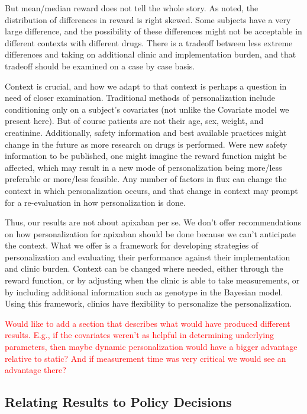 But mean/median reward does not tell the whole story.  As noted, the distribution of differences in reward is right skewed.  Some subjects have a very large difference, and the possibility of these differences might not be acceptable in different contexts with different drugs.  There is a tradeoff between less extreme differences and taking on additional clinic and implementation burden, and that tradeoff should be examined on a case by case basis.

Context is crucial, and how we adapt to that context is perhaps a question in need of closer examination.  Traditional methods of personalization include conditioning only on a subject’s covariates (not unlike the Covariate model we present here).  But of course patients are not their age, sex, weight, and creatinine.  Additionally, safety information and best available practices might change in the future as more research on drugs is performed. Were new safety information to be published, one might imagine the reward function might be affected, which may result in a new mode of personalization being more/less preferable or more/less feasible.  Any number of factors in flux can change the context in which personalization occurs, and that change in context may prompt for a re-evaluation in how personalization is done.

Thus, our results are not about apixaban per se.  We don’t offer recommendations on how personalization for apixaban should be done because we can’t anticipate the context.  What we offer is a framework for developing strategies of personalization and evaluating their performance against their implementation and clinic burden.  Context can be changed where needed, either through the reward function, or by adjusting when the clinic is able to take measurements, or by including additional information such as genotype in the Bayesian model.  Using this framework, clinics have flexibility to personalize the personalization.

\textcolor{red}{Would like to add a section that describes what would have produced different results. E.g., if the covariates weren't as helpful in determining underlying parameters, then maybe dynamic personalization would have a bigger advantage relative to static? And if measurement time was very critical we would see an advantage there?}

\subsection{Relating Results to Policy Decisions}

